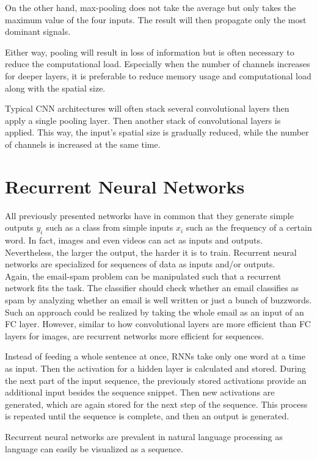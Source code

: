 On the other hand, max-pooling does not take the average but only takes the maximum value of the four inputs.
The result will then propagate only the most dominant signals.

Either way, pooling will result in loss of information but is often necessary to reduce the computational load.
Especially when the number of channels increases for deeper layers, it is preferable to reduce memory usage and computational load along with the spatial size.

Typical CNN architectures will often stack several convolutional layers then apply a single pooling layer.
Then another stack of convolutional layers is applied.
This way, the input's spatial size is gradually reduced, while the number of channels is increased at the same time.

\section{Recurrent Neural Networks}
All previously presented networks have in common that they generate simple outputs $y_i$ such as a class from simple inputs $x_i$ such as the frequency of a certain word.
In fact, images and even videos can act as inputs and outputs.
Nevertheless, the larger the output, the harder it is to train.
Recurrent neural networks are specialized for sequences of data as inputs and/or outputs.\\
Again, the email-spam problem can be manipulated such that a recurrent network fits the task.
The classifier should check whether an email classifies as spam by analyzing whether an email is well written or just a bunch of buzzwords.
Such an approach could be realized by taking the whole email as an input of an FC layer.
However, similar to how convolutional layers are more efficient than FC layers for images, are recurrent networks more efficient for sequences.

Instead of feeding a whole sentence at once, RNNs take only one word at a time as input.
Then the activation for a hidden layer is calculated and stored.
During the next part of the input sequence, the previously stored activations provide an additional input besides the sequence snippet.
Then new activations are generated, which are again stored for the next step of the sequence.
This process is repeated until the sequence is complete, and then an output is generated.

Recurrent neural networks are prevalent in natural language processing as language can easily be visualized as a sequence.

